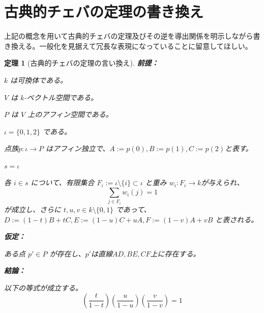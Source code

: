 \documentclass[a4paper,12pt]{bxjsbook}
\newlength{\customindent}
\newenvironment{body}{
  \par
  \begingroup
  \setlength{\leftskip}{\customindent}
  \setlength{\rightskip}{0pt}
  \setlength{\parindent}{1em}
  \setlength{\displayindent}{\customindent}
  \setlength{\displaywidth}{\dimexpr\linewidth-\customindent\relax}
}{
  \par
  \endgroup
}
\theoremstyle{theorem}
\newtheorem{theorem}{定理}[chapter]
\begin{document}
    \section{古典的チェバの定理の書き換え}

    \begin{body}
        \indent 上記の概念を用いて古典的チェバの定理及びその逆を導出関係を明示しながら書き換える。一般化を見据えて冗長な表現になっていることに留意してほしい。
    \end{body}

    \begin{theorem}[古典的チェバの定理の言い換え]

        \noindent\textbf{前提：}\par
        \begin{theoremenumerate}[label=(P\arabic*), leftmargin=4em, topsep=2pt, partopsep=0pt, itemsep=0pt, parsep=0pt]
            \item $k$ は可換体である。
            \item $V$ は $k$-ベクトル空間である。
            \item $P$ は $V$ 上のアフィン空間である。
            \item $\iota = \{0,1,2\}$ である。
            \item 点族$p:\iota \to P$ はアフィン独立で、$A:=p(0), B:=p(1), C:=p(2)$と表す。
            \item $s = \iota$          
            \item 各 $i\in s$ について、有限集合 $F_i:=\iota\setminus\{i\}\subset \iota$ と重み $w_i:F_i\to k$が与えられ、
            \[
            \sum_{j\in F_i} w_i(j)=1
            \]
            が成立し、さらに $t,u,v \in k \setminus \{0,1\}$ であって、$D:=(1-t)B+tC, E:=(1-u)C+uA, F:=(1-v)A+vB$ と表される。
        \end{theoremenumerate}
        
        \noindent\textbf{仮定：}\par
        \begin{theoremenumerate}[label=(A\arabic*), leftmargin=4em, topsep=2pt, partopsep=0pt, itemsep=0pt, parsep=0pt]
            \item ある点 $p' \in P$ が存在し、$p'$は直線$AD, BE, CF$上に存在する。
        \end{theoremenumerate}
        
        \noindent\textbf{結論：}\par
        \begin{theoremenumerate}[label=(\roman*), leftmargin=4em, topsep=2pt, partopsep=0pt, itemsep=0pt, parsep=0pt]
            \item 以下の等式が成立する。
            \[
            \left(\frac{t}{1-t}\right)\left(\frac{u}{1-u}\right)\left(\frac{v}{1-v}\right)=1
            \]
        \end{theoremenumerate}
    \end{theorem}
\end{document}
